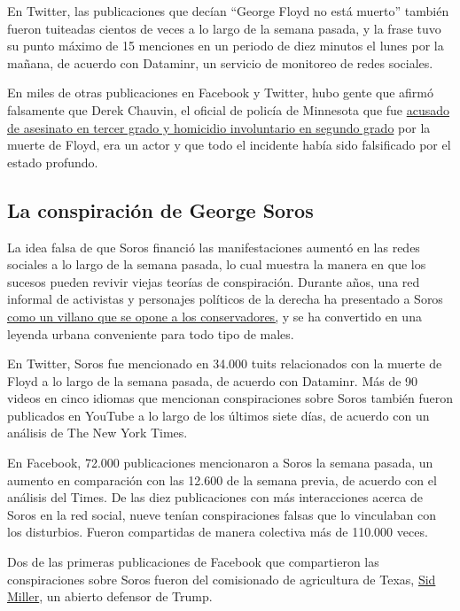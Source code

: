 En Twitter, las publicaciones que decían ``George Floyd no está muerto''
también fueron tuiteadas cientos de veces a lo largo de la semana
pasada, y la frase tuvo su punto máximo de 15 menciones en un periodo de
diez minutos el lunes por la mañana, de acuerdo con Dataminr, un
servicio de monitoreo de redes sociales.

En miles de otras publicaciones en Facebook y Twitter, hubo gente que
afirmó falsamente que Derek Chauvin, el oficial de policía de Minnesota
que fue
\href{https://www.nytimes.com/2020/05/29/us/minneapolis-police-george-floyd.html}{acusado
de asesinato en tercer grado y homicidio involuntario en segundo grado}
por la muerte de Floyd, era un actor y que todo el incidente había sido
falsificado por el estado profundo.

\hypertarget{la-conspiraciuxf3n-de-george-soros}{%
\subsection{La conspiración de George
Soros}\label{la-conspiraciuxf3n-de-george-soros}}

La idea falsa de que Soros financió las manifestaciones aumentó en las
redes sociales a lo largo de la semana pasada, lo cual muestra la manera
en que los sucesos pueden revivir viejas teorías de conspiración.
Durante años, una red informal de activistas y personajes políticos de
la derecha ha presentado a Soros
\href{https://www.nytimes.com/2018/05/29/us/roseanne-george-soros-twitter.html}{como
un villano que se opone a los conservadores,} y se ha convertido en una
leyenda urbana conveniente para todo tipo de males.

En Twitter, Soros fue mencionado en 34.000 tuits relacionados con la
muerte de Floyd a lo largo de la semana pasada, de acuerdo con Dataminr.
Más de 90 videos en cinco idiomas que mencionan conspiraciones sobre
Soros también fueron publicados en YouTube a lo largo de los últimos
siete días, de acuerdo con un análisis de The New York Times.

En Facebook, 72.000 publicaciones mencionaron a Soros la semana pasada,
un aumento en comparación con las 12.600 de la semana previa, de acuerdo
con el análisis del Times. De las diez publicaciones con más
interacciones acerca de Soros en la red social, nueve tenían
conspiraciones falsas que lo vinculaban con los disturbios. Fueron
compartidas de manera colectiva más de 110.000 veces.

Dos de las primeras publicaciones de Facebook que compartieron las
conspiraciones sobre Soros fueron del comisionado de agricultura de
Texas, \href{https://www.facebook.com/MillerForTexas/}{Sid Miller}, un
abierto defensor de Trump.

